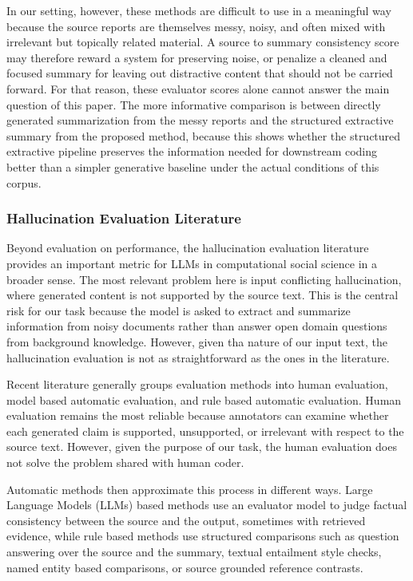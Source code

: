 \documentclass{article}
\begin{document}
In our setting, however, these methods are difficult to use in a meaningful way because the source reports are themselves messy, noisy, and often mixed with irrelevant but topically related material. A source to summary consistency score may therefore reward a system for preserving noise, or penalize a cleaned and focused summary for leaving out distractive content that should not be carried forward. For that reason, these evaluator scores alone cannot answer the main question of this paper. The more informative comparison is between directly generated summarization from the messy reports and the structured extractive summary from the proposed method, because this shows whether the structured extractive pipeline preserves the information needed for downstream coding better than a simpler generative baseline under the actual conditions of this corpus.

\subsubsection{Hallucination Evaluation
Literature}\label{hallucination-evaluation-literature}

Beyond evaluation on performance, the hallucination evaluation literature provides an important metric for LLMs in computational social science in a broader sense. The most relevant problem here is input conflicting hallucination, where generated content is not supported by the source text. This is the central risk for our task because the model is asked to extract and summarize information from noisy documents rather than answer open domain questions from background knowledge. However, given tha nature of our input text, the hallucination evaluation is not as straightforward as the ones in the literature.

Recent literature generally groups evaluation methods into human evaluation, model based automatic evaluation, and rule based automatic evaluation. Human evaluation remains the most reliable because annotators can examine whether each generated claim is supported, unsupported, or irrelevant with respect to the source text. However, given the purpose of our task, the human evaluation does not solve the problem shared with human coder.

Automatic methods then approximate this process in different ways. Large Language Models (LLMs) based methods use an evaluator model to judge factual consistency between the source and the output, sometimes with retrieved evidence, while rule based methods use structured comparisons such as question answering over the source and the summary, textual entailment style checks, named entity based comparisons, or source grounded reference contrasts.
\end{document}
